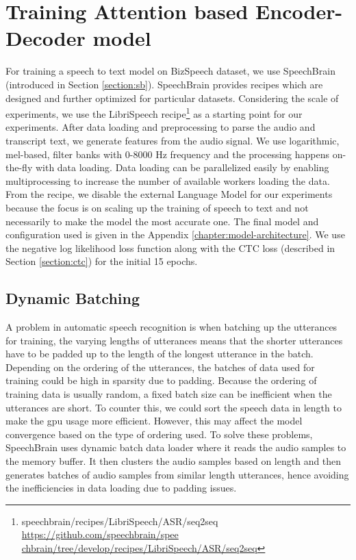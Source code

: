 \section{Training Attention based Encoder-Decoder model}
\label{section:attention_train}
For training a speech to text model on BizSpeech dataset, we use SpeechBrain (introduced in Section \ref{section:sb}). SpeechBrain provides recipes which are designed and further optimized for particular datasets. Considering the scale of experiments, we use the LibriSpeech recipe\footnote{speechbrain/recipes/LibriSpeech/ASR/seq2seq \href{https://github.com/speechbrain/speechbrain/tree/develop/recipes/LibriSpeech/ASR/seq2seq}{https://github.com/speechbrain/spee chbrain/tree/develop/recipes/LibriSpeech/ASR/seq2seq}} as a starting point for our experiments. After data loading and preprocessing to parse the audio and transcript text, we generate features from the audio signal. We use logarithmic, mel-based, filter banks 
\cite{Vetterli1992WaveletsDesign} with  0-8000 Hz frequency and the processing happens on-the-fly with data loading. Data loading can be parallelized easily by enabling multiprocessing to increase the number of available workers loading the data. From the recipe, we disable the external Language Model for our experiments because the focus is on scaling up the training of speech to text and not necessarily to make the model the most accurate one. The final model and configuration used is given in the Appendix \ref{chapter:model-architecture}. We use the negative log likelihood loss function along with the CTC loss (described in Section \ref{section:ctc}) for the initial 15 epochs. 

\subsection{Dynamic Batching}
\label{section:dynbatch}
A problem in automatic speech recognition is when batching up the utterances for training, the varying lengths of utterances means that the shorter utterances have to be padded up to the length of the longest utterance in the batch. Depending on the ordering of the utterances, the batches of data used for training could be high in sparsity due to padding. Because the ordering of training data is usually random, a fixed batch size can be inefficient when the utterances are short. To counter this, we could sort the speech data in length to make the \acrshort{gpu} usage more efficient. However, this may affect the model convergence based on the type of ordering used. To solve these problems, SpeechBrain uses dynamic batch data loader where it reads the audio samples to the memory buffer. It then clusters the audio samples based on length and then generates batches of audio samples from similar length utterances, hence avoiding the inefficiencies in data loading due to padding issues. 

